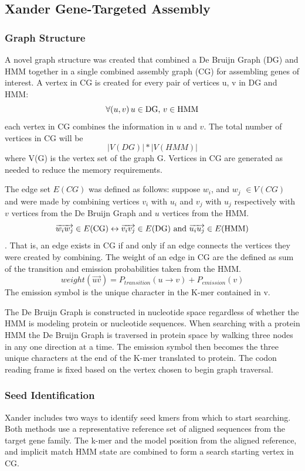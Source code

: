 \documentclass[10pt]{bmc_article}
\newenvironment{bmcformat}{\begin{raggedright}\baselineskip20pt\sloppy\setboolean{publ}{false}}{\end{raggedright}\baselineskip20pt\sloppy}
\begin{document}
\begin{bmcformat}
\subsection*{Xander Gene-Targeted Assembly}
\subsubsection*{Graph Structure}
A novel graph structure was created that combined a De Bruijn Graph (DG) and HMM together in a single combined assembly graph (CG) for assembling genes of interest.  A vertex in CG is created for every pair of vertices u, v in DG and HMM:
\[ \forall (u,v)\, u\in \textnormal{DG, }v\in \textnormal{HMM} \] each vertex in CG combines the information in $u$ and $v$.
The total number of vertices in CG will be \[|V(DG)| * |V(HMM)|\] where V(G) is the vertex set of the graph G.  Vertices in CG are generated as needed to reduce the memory requirements.

The edge set $E(CG)$ was defined as follows: suppose $w_i$, and $w_j$ \(\in V(CG) \) and were made by combining vertices $v_i$ with $u_i$ and $v_j$ with $u_j$ respectively with $v$ vertices from the De Bruijn Graph and $u$ vertices from the HMM.
\[\overrightarrow{w_iw_j} \in E(\textnormal{CG}) \leftrightarrow \overrightarrow{v_iv_j} \in E(\textnormal{DG})\textnormal{ and } \overrightarrow{u_iu_j} \in E(\textnormal{HMM})\].
That is, an edge exists in CG if and only if an edge connects the vertices they were created by combining. The weight of an edge  in CG are the defined as sum of the transition and emission probabilities taken from the HMM.  
\[ weight(\overrightarrow{uv}) = P_{transition}(u \rightarrow v) + P_{emission}(v) \]
The emission symbol is the unique character in the K-mer contained in v.

The De Bruijn Graph is constructed in nucleotide space regardless of whether the HMM is modeling protein or nucleotide sequences. When searching with a protein HMM the De Bruijn Graph is traversed in protein space by walking three nodes in any one direction at a time.  The emission symbol then becomes the three unique characters at the end of the K-mer translated to protein.  The codon reading frame is fixed based on the vertex chosen to begin graph traversal.

\subsubsection*{Seed Identification}
Xander includes two ways to identify seed kmers from which to start searching.  Both methods use a representative reference set of aligned sequences from the target gene family.  The k-mer and the model position from the aligned reference, and implicit match HMM state are combined to form a search starting vertex in CG.


\end{bmcformat}
\end{document}
